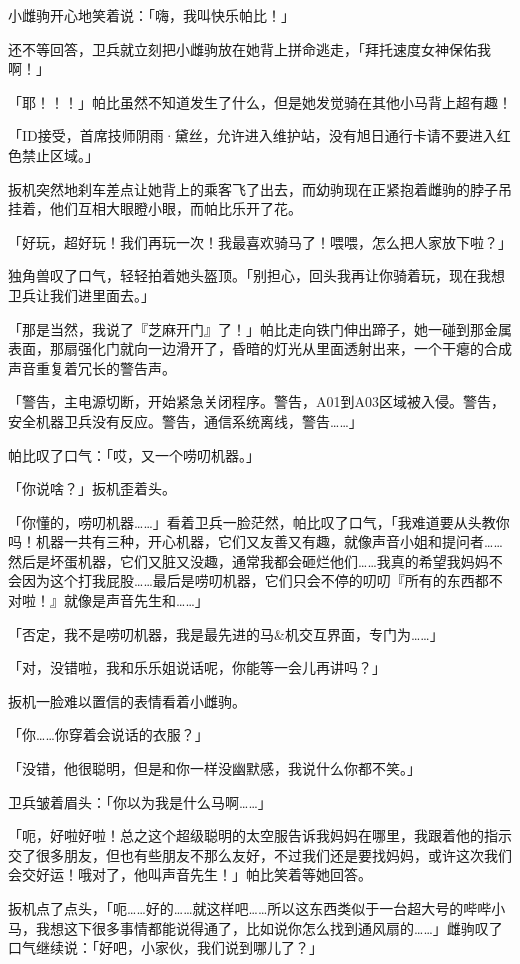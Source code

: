 小雌驹开心地笑着说：「嗨，我叫快乐帕比！」

还不等回答，卫兵就立刻把小雌驹放在她背上拼命逃走，「拜托速度女神保佑我啊！」

「耶！！！」帕比虽然不知道发生了什么，但是她发觉骑在其他小马背上超有趣！

「{\mt ID接受，首席技师阴雨·黛丝，允许进入维护站，没有旭日通行卡请不要进入红色禁止区域。}」

扳机突然地刹车差点让她背上的乘客飞了出去，而幼驹现在正紧抱着雌驹的脖子吊挂着，他们互相大眼瞪小眼，而帕比乐开了花。

「好玩，超好玩！我们再玩一次！我最喜欢骑马了！喂喂，怎么把人家放下啦？」

独角兽叹了口气，轻轻拍着她头盔顶。「别担心，回头我再让你骑着玩，现在我想卫兵让我们进里面去。」

「那是当然，我说了『芝麻开门』了！」帕比走向铁门伸出蹄子，她一碰到那金属表面，那扇强化门就向一边滑开了，昏暗的灯光从里面透射出来，一个干瘪的合成声音重复着冗长的警告声。

「{\mt 警告，主电源切断，开始紧急关闭程序。警告，A01到A03区域被入侵。警告，安全机器卫兵没有反应。警告，通信系统离线，警告……}」

帕比叹了口气：「哎，又一个唠叨机器。」

「你说啥？」扳机歪着头。

「你懂的，唠叨机器……」看着卫兵一脸茫然，帕比叹了口气，「我难道要从头教你吗！机器一共有三种，开心机器，它们又友善又有趣，就像声音小姐和提问者……然后是坏蛋机器，它们又脏又没趣，通常我都会砸烂他们……我真的希望我妈妈不会因为这个打我屁股……最后是唠叨机器，它们只会不停的叨叨『所有的东西都不对啦！』就像是声音先生和……」

「否定，我不是唠叨机器，我是最先进的马\&机交互界面，专门为……」

「对，没错啦，我和乐乐姐说话呢，你能等一会儿再讲吗？」

扳机一脸难以置信的表情看着小雌驹。

「你……你穿着会说话的衣服？」

「没错，他很聪明，但是和你一样没幽默感，我说什么你都不笑。」

卫兵皱着眉头：「你以为我是什么马啊……」

「呃，好啦好啦！总之这个超级聪明的太空服告诉我妈妈在哪里，我跟着他的指示交了很多朋友，但也有些朋友不那么友好，不过我们还是要找妈妈，或许这次我们会交好运！哦对了，他叫声音先生！」帕比笑着等她回答。

扳机点了点头，「呃……好的……就这样吧……所以这东西类似于一台超大号的哔哔小马，我想这下很多事情都能说得通了，比如说你怎么找到通风扇的……」雌驹叹了口气继续说：「好吧，小家伙，我们说到哪儿了？」

